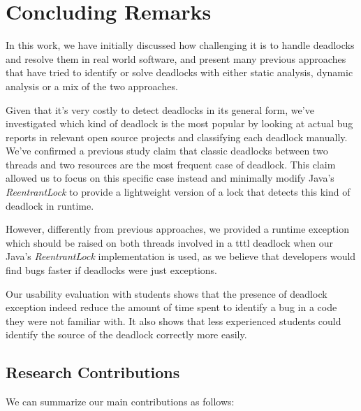 \chapter{Concluding Remarks}
\label{conclusion}

In this work, we have initially discussed how challenging it is to handle deadlocks and resolve them in real world software, and present many previous approaches that
have tried to identify or solve deadlocks with either static analysis, dynamic analysis or a mix of the two approaches.

Given that it's very costly to detect deadlocks in its general form, we've investigated which kind of deadlock is the most popular by looking at actual bug reports
in relevant open source projects and classifying each deadlock manually. We've confirmed a previous study claim that classic deadlocks between two threads and two resources
are the most frequent case of deadlock. This claim allowed us to focus on this specific case instead and minimally modify Java's \emph{ReentrantLock} to provide a lightweight
version of a lock that detects this kind of deadlock in runtime.

However, differently from previous approaches, we provided a runtime exception which should be raised on both threads involved in a \ac{tttl} deadlock
when our Java's \emph{ReentrantLock} implementation is used, as we believe that developers would find bugs faster if deadlocks were just exceptions.

Our usability evaluation with students shows that the presence of deadlock exception indeed reduce the amount of time spent to identify a bug in a code they were not familiar with.
It also shows that less experienced students could identify the source of the deadlock correctly more easily.

\section{Research Contributions}

We can summarize our main contributions as follows:

